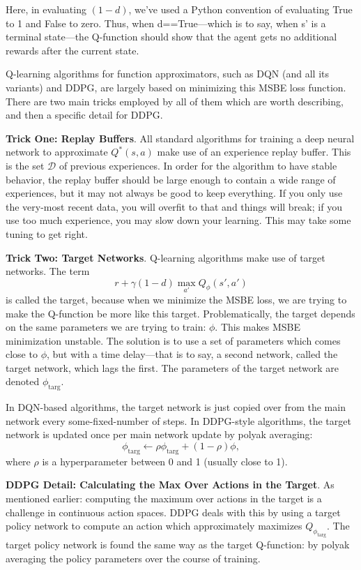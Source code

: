 Here, in evaluating $(1-d)$, we've used a Python convention of evaluating True to 1 and False to zero. Thus, when d==True---which is to say, when s' is a terminal state---the Q-function should show that the agent gets no additional rewards after the current state.

Q-learning algorithms for function approximators, such as DQN (and all its variants) and DDPG, are largely based on minimizing this MSBE loss function. There are two main tricks employed by all of them which are worth describing, and then a specific detail for DDPG.

\textbf{Trick One: Replay Buffers}. All standard algorithms for training a deep neural network to approximate $Q^*(s,a)$ make use of an experience replay buffer. This is the set ${\mathcal D}$ of previous experiences. In order for the algorithm to have stable behavior, the replay buffer should be large enough to contain a wide range of experiences, but it may not always be good to keep everything. If you only use the very-most recent data, you will overfit to that and things will break; if you use too much experience, you may slow down your learning. This may take some tuning to get right.

\textbf{Trick Two: Target Networks}. Q-learning algorithms make use of target networks. The term
\begin{equation}
r + \gamma (1 - d) \max_{a'} Q_{\phi}(s',a')
\end{equation}
is called the target, because when we minimize the MSBE loss, we are trying to make the Q-function be more like this target. Problematically, the target depends on the same parameters we are trying to train: $\phi$. This makes MSBE minimization unstable. The solution is to use a set of parameters which comes close to $\phi$, but with a time delay---that is to say, a second network, called the target network, which lags the first. The parameters of the target network are denoted $\phi_{\text{targ}}$.

In DQN-based algorithms, the target network is just copied over from the main network every some-fixed-number of steps. In DDPG-style algorithms, the target network is updated once per main network update by polyak averaging:
\begin{equation}
\phi_{\text{targ}} \leftarrow \rho \phi_{\text{targ}} + (1 - \rho) \phi,
\end{equation}
where $\rho$ is a hyperparameter between 0 and 1 (usually close to 1).

\textbf{DDPG Detail: Calculating the Max Over Actions in the Target}. As mentioned earlier: computing the maximum over actions in the target is a challenge in continuous action spaces. DDPG deals with this by using a target policy network to compute an action which approximately maximizes $Q_{\phi_{\text{targ}}}$. The target policy network is found the same way as the target Q-function: by polyak averaging the policy parameters over the course of training.


